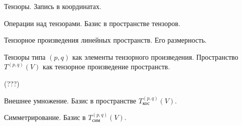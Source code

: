\documentclass[a4paper]{article}
\begin{document}
\begin{nums}{-1}
\item Тензоры. Запись в координатах.
\item Операции над тензорами. Базис в пространстве тензоров.
\item Тензорное произведения линейных пространств. Его размерность.
\item Тензоры типа $(p,q)$ как элементы тензорного произведения. Пространство $T^{(p,q)}(V)$ как тензорное произведение пространств.
\item (???)
\item Внешнее умножение. Базис в пространстве $T^{(p,q)}_{\text{кос}}(V)$.
\item Симметрирование. Базис в $T^{(p,q)}_{\text{сим}}(V)$.
\end{nums}

\medskip\dmvntrail
\end{document}
